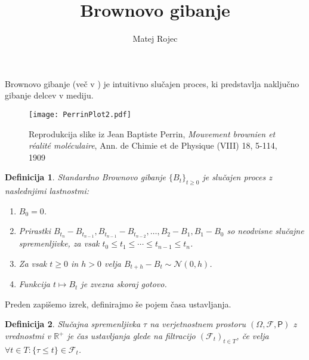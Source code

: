 \documentclass[11pt]{article}
\newtheorem{definicija}{Definicija}
\begin{document}
\newcommand{\f}{\mathcal{F}}

\title{Brownovo gibanje}
\author{Matej Rojec}
\date{}

\maketitle

Brownovo gibanje (več v \cite{karatzas1991brownian}) je intuitivno slučajen proces, %
ki predstavlja naključno gibanje delcev v mediju. 
    

    \begin{figure}[ht]
        \centering
        \texttt{[image: PerrinPlot2.pdf]}
        \caption{Reprodukcija slike iz Jean Baptiste Perrin, \emph{Mouvement brownien et réalité moléculaire}, Ann. de Chimie et de Physique (VIII) 18, 5-114, 1909}
    \end{figure}

   \begin{definicija}
     Standardno Brownovo gibanje $\{B_t\}_{t \geq 0}$ je slučajen proces z naslednjimi lastnostmi: 
         
         \begin{enumerate}
            \item $B_0 = 0$.
            \item Prirastki $B_{t_n} - B_{t_{n-1}}, B_{t_{n-1}} - B_{t_{n-2}}, \ldots, B_2 - B_1, B_1 - B_0$ so neodvisne slučajne spremenljivke, za vsak $t_0 \leq t_1 \leq \cdots \leq t_{n-1} \leq t_n$.
            \item Za vsak $t \geq 0$ in $h > 0$ velja $B_{t+h} - B_t \sim \mathcal{N}(0, h)$.
            \item Funkcija $t \mapsto B_t$ je zvezna skoraj gotovo.
         \end{enumerate}
   \end{definicija}
    
    Preden zapišemo izrek, definirajmo še pojem časa ustavljanja.
    
    
    \begin{definicija}
        Slučajna spremenljivka $\tau$ na verjetnostnem prostoru $(\Omega, \f, \mathsf{P})$ z vrednostmi v $\mathbb{R}^+$
        je čas ustavljanja glede na filtracijo $(\f_t)_{t \in T}$, če velja $\forall t \in T : \{\tau \leq t\} \in \f_t$.
    \end{definicija}
    
\end{document}
